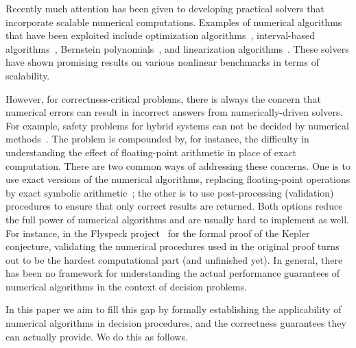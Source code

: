 \documentclass[envcountsect]{llncs}
\begin{document}
Recently much attention has been given to developing practical solvers that incorporate scalable numerical computations. Examples of numerical algorithms that have been exploited include optimization algorithms~\cite{BorrallerasLNRR09,DBLP:conf/fmcad/NuzzoPSS10}, interval-based algorithms~\cite{HySAT,DBLP:conf/atva/EggersFH08,DBLP:conf/sefm/EggersRNF11,DBLP:conf/fmcad/Gao10}, Bernstein polynomials~\cite{bern}, and linearization algorithms~\cite{cordic}. These solvers have shown promising results on various nonlinear benchmarks in terms of scalability. 

However, for correctness-critical problems, there is always the concern that numerical errors can result in incorrect answers from numerically-driven solvers. For example, safety problems for hybrid systems can not be decided by numerical methods~\cite{andre07}. The problem is compounded by, for instance, the difficulty in understanding the effect of floating-point arithmetic in place of exact computation. There are two common ways of addressing these concerns. One is to use exact versions of the numerical algorithms, replacing floating-point operations by exact symbolic arithmetic~\cite{bern}; the other is to use post-processing (validation) procedures to ensure that only correct results are returned. Both options reduce the full power of numerical algorithms and are usually hard to implement as well. For instance, in the Flyspeck project~\cite{DBLP:conf/dagstuhl/Hales05} for the formal proof of the Kepler conjecture, validating the numerical procedures used in the original proof turns out to be the hardest computational part (and unfinished yet). In general, there has been no framework for understanding the actual performance guarantees of numerical algorithms in the context of decision problems. 

In this paper we aim to fill this gap by formally establishing the applicability of numerical algorithms in decision procedures, and the correctness guarantees they can actually provide. We do this as follows.
\end{document}
